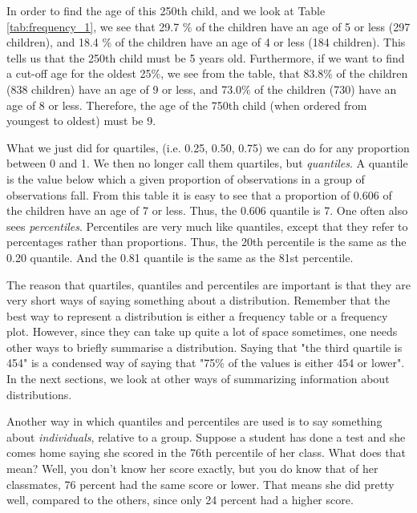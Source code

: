 In order to find the age of this 250th child, and we look at Table \ref{tab:frequency_1}, we see that 29.7 \% of the children have an age of 5 or less (297 children), and 18.4 \% of the children have an age of 4 or less (184 children). This tells us that the 250th child must be 5 years old. Furthermore, if we want to find a cut-off age for the oldest 25\%, we see from the table, that 83.8\% of the children (838 children) have an age of 9 or less, and 73.0\% of the children (730) have an age of 8 or less. Therefore, the age of the 750th child (when ordered from youngest to oldest) must be 9.


What we just did for quartiles, (i.e. 0.25, 0.50, 0.75) we can do for any proportion between 0 and 1. We then no longer call them quartiles, but \textit{quantiles}. A quantile is the value below which a given proportion of observations in a group of observations fall. From this table it is easy to see that a proportion of 0.606 of the children have an age of 7 or less. Thus, the 0.606 quantile is 7. One often also sees \textit{percentiles}. Percentiles are very much like quantiles, except that they refer to percentages rather than proportions. Thus, the 20th percentile is the same as the 0.20 quantile. And the 0.81 quantile is the same as the 81st percentile.

The reason that quartiles, quantiles and percentiles are important is that they are very short ways of saying something about a distribution. Remember that the best way to represent a distribution is either a frequency table or a frequency plot. However, since they can take up quite a lot of space sometimes, one needs other ways to briefly summarise a distribution. Saying that "the third quartile is 454" is a condensed way of saying that "75\% of the values is either 454 or lower". In the next sections, we look at other ways of summarizing information about distributions.

Another way in which quantiles and percentiles are used is to say something about \textit{individuals}, relative to a group. Suppose a student has done a test and she comes home saying she scored in the 76th percentile of her class. What does that mean? Well, you don't know her score exactly, but you do know that of her classmates, 76 percent had the same score or lower. That means she did pretty well, compared to the others, since only 24 percent had a higher score.

